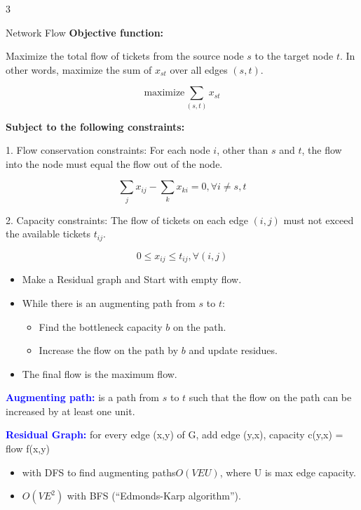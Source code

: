 \documentclass[10pt,a4paper]{article}
\begin{document}
\begin{multicols}{3}
\begin{textbox}{Network Flow}
    \textbf{Objective function:}

    Maximize the total flow of tickets from the source node $s$ to the target node $t$. In other words, maximize the sum of $x_{st}$ over all edges $(s, t)$.

    \begin{equation}
    \text{maximize} \sum_{(s, t)} x_{st}
    \end{equation}

    \textbf{Subject to the following constraints:}

    1. Flow conservation constraints: For each node $i$, other than $s$ and $t$, the flow into the node must equal the flow out of the node.

    \begin{equation}
    \sum_{j} x_{ij} - \sum_{k} x_{ki} = 0, \forall i \neq s, t
    \end{equation}

    2. Capacity constraints: The flow of tickets on each edge $(i, j)$ must not exceed the available tickets $t_{ij}$.

    \begin{equation}
    0 \le x_{ij} \le t_{ij}, \forall (i, j)
    \end{equation}
    \begin{itemize}
        \item Make a Residual graph and Start with empty flow.
        \item While there is an augmenting path from $s$ to $t$:
            \begin{itemize}
                \item Find the bottleneck capacity $b$ on the path.
                \item Increase the flow on the path by $b$ and update residues.
            \end{itemize}
        \item The final flow is the maximum flow.
    \end{itemize}
    \textcolor{blue}{{\bf Augmenting path:}} is a path from $s$ to $t$ such that the flow on the path can be increased by at least one unit.
    
    \textcolor{blue}{{\bf Residual Graph:}}  for every edge (x,y) of G, add edge (y,x), capacity c(y,x) = flow f(x,y)

    \begin{itemize}
        \item with DFS to find augmenting paths$O(VEU)$, where U is max edge capacity.
        \item $O(VE^2)$ with BFS (“Edmonds-Karp algorithm”).
    \end{itemize}
    

\end{textbox}
\end{multicols}
\end{document}
